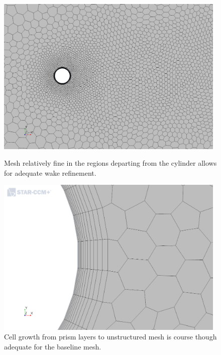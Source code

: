 \documentclass[10pt,english]{article}
\begin{document}
\begin{figure}[h]
\centering
\begin{minipage}{.49\textwidth}
  \centering
\includegraphics[trim={1.0cm 0cm 1.4cm 0.5cm},clip,width=0.98\textwidth]{cylinder_2_05_MeshScene2_2.png}
\caption{Mesh relatively fine in the regions departing from the cylinder allows for adequate wake refinement.}
\label{f:mesh05_2}
\end{minipage}%
\hspace{5pt}
\begin{minipage}{.49\textwidth}
  \centering
\includegraphics[trim={1.0cm 0cm 1.4cm .5cm},clip,width=0.98\textwidth]{cylinder_2_05_MeshScene2_3.png}
\caption{\vspace{0pt} Cell growth from prism layers to unstructured mesh is course though adequate for the baseline mesh.}
\label{f:mesh05_3}
\end{minipage}
\end{figure}
 
\end{document}
